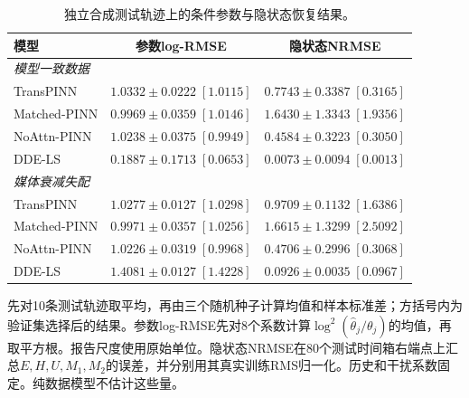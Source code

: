 \begin{table}[t]
\centering
\caption{独立合成测试轨迹上的条件参数与隐状态恢复结果。}
\label{tab:synthetic_recovery}
\footnotesize
\setlength{\tabcolsep}{4pt}
\renewcommand{\arraystretch}{1.08}
\begin{tabular*}{\textwidth}{@{\extracolsep{\fill}}lcc@{}}
\toprule
模型 & 参数log-RMSE & 隐状态NRMSE \\
\midrule
\multicolumn{3}{l}{\textit{模型一致数据}} \\
TransPINN & $1.0332\pm0.0222\;[1.0115]$ & $0.7743\pm0.3387\;[0.3165]$ \\
Matched-PINN & $0.9969\pm0.0359\;[1.0146]$ & $1.6430\pm1.3343\;[1.9356]$ \\
NoAttn-PINN & $1.0238\pm0.0375\;[0.9949]$ & $0.4584\pm0.3223\;[0.3050]$ \\
DDE-LS & $0.1887\pm0.1713\;[0.0653]$ & $0.0073\pm0.0094\;[0.0013]$ \\
\midrule
\multicolumn{3}{l}{\textit{媒体衰减失配}} \\
TransPINN & $1.0277\pm0.0127\;[1.0298]$ & $0.9709\pm0.1132\;[1.6386]$ \\
Matched-PINN & $0.9971\pm0.0357\;[1.0256]$ & $1.6615\pm1.3299\;[2.5092]$ \\
NoAttn-PINN & $1.0226\pm0.0319\;[0.9968]$ & $0.4706\pm0.2996\;[0.3068]$ \\
DDE-LS & $1.4081\pm0.0127\;[1.4228]$ & $0.0926\pm0.0035\;[0.0967]$ \\
\bottomrule
\end{tabular*}
\par\smallskip
\begin{minipage}{\textwidth}\footnotesize 先对10条测试轨迹取平均，再由三个随机种子计算均值和样本标准差；方括号内为验证集选择后的结果。参数log-RMSE先对8个系数计算$\log^2(\widehat\theta_j/\theta_j)$的均值，再取平方根。报告尺度使用原始单位。隐状态NRMSE在80个测试时间箱右端点上汇总$E,H,U,M_1,M_2$的误差，并分别用其真实训练RMS归一化。历史和干扰系数固定。纯数据模型不估计这些量。\end{minipage}
\end{table}

